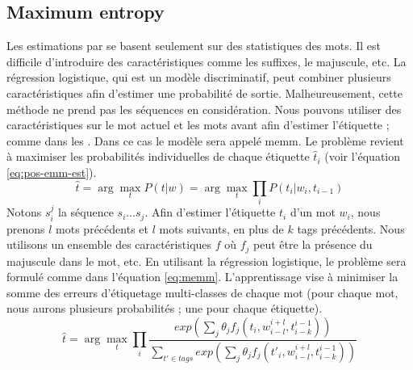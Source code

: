 \documentclass{KodeBook}
\begin{document}
\subsection{Maximum entropy}

Les estimations par  se basent seulement sur des statistiques des mots. 
Il est difficile d'introduire des caractéristiques comme les suffixes, le majuscule, etc. 
La régression logistique, qui est un modèle discriminatif, peut combiner plusieurs caractéristiques afin d'estimer une probabilité de sortie. 
Malheureusement, cette méthode ne prend pas les séquences en considération.
Nous pouvons utiliser des caractéristiques sur le mot actuel et les mots avant afin d'estimer l'étiquette ; comme dans les .
Dans ce cas le modèle sera appelé \acf{memm}.
Le problème revient à maximiser les probabilités individuelles de chaque étiquette $\hat{t}_i$ (voir l'équation \ref{eq:pos-emm-est}). 
\begin{equation}\label{eq:pos-emm-est}
\hat{t} = \arg\max\limits_t P(t | w) = \arg\max\limits_t \prod\limits_{i}  P(t_i | w_i, t_{i-1})
\end{equation}
Notons $s_i^j$ la séquence $s_i \ldots s_j$. 
Afin d'estimer l'étiquette $t_i$ d'un mot $w_i$, nous prenons $l$ mots précédents et $l$ mots suivants, en plus de $k$ tags précédents.
Nous utilisons un ensemble des caractéristiques $f$ où $f_j$ peut être la présence du majuscule dans le mot, etc.
En utilisant la régression logistique, le problème sera formulé comme dans l'équation \ref{eq:memm}.
L'apprentissage vise à minimiser la somme des erreurs d'étiquetage multi-classes de chaque mot (pour chaque mot, nous aurons plusieurs probabilités ; une pour chaque étiquette).
\begin{equation}\label{eq:memm}
\hat{t} = \arg\max\limits_t \prod\limits_{i}  
\frac{exp\left(\sum_j \theta_j f_j(t_i, w_{i-l}^{i+l}, t_{i-k}^{i-1})\right)}%
{\sum_{t' \in tags} exp\left(\sum_j \theta_j f_j(t'_i, w_{i-l}^{i+l}, t_{i-k}^{i-1})\right)}
\end{equation}
\end{document}

